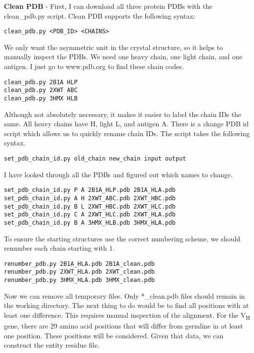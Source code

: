 \textbf{Clean PDB} - First, I can download all three protein PDBs with the clean\_pdb.py script. Clean PDB supports the following syntax:


\begin{lstlisting}[breaklines=true]
clean_pdb.py <PDB_ID> <CHAINS>
\end{lstlisting}

We only want the asymmetric unit in the crystal structure, so it helps to manually inspect the PDBs. We need one heavy chain, one light chain, and one antigen. I just go to www.pdb.org to find these chain codes.
\begin{lstlisting}
clean_pdb.py 2B1A HLP
clean_pdb.py 2XWT ABC
clean_pdb.py 3HMX HLB
\end{lstlisting}
Although not absolutely necessary, it makes it easier to label the chain IDs the same. All heavy chains have H, light L, and antigen A. There is a change PDB id script which allows us to quickly rename chain IDs. The script takes the following syntax.

\begin{lstlisting}[breaklines=true]
set_pdb_chain_id.py old_chain new_chain input output
\end{lstlisting}
I have looked through all the PDBs and figured out which names to change.

\begin{lstlisting}
set_pdb_chain_id.py P A 2B1A_HLP.pdb 2B1A_HLA.pdb
set_pdb_chain_id.py A H 2XWT_ABC.pdb 2XWT_HBC.pdb
set_pdb_chain_id.py B L 2XWT_HBC.pdb 2XWT_HLC.pdb
set_pdb_chain_id.py C A 2XWT_HLC.pdb 2XWT_HLA.pdb
set_pdb_chain_id.py B A 3HMX_HLB.pdb 3HMX_HLA.pdb
\end{lstlisting}
To ensure the starting structures use the correct numbering scheme, we should renumber each chain starting with 1.

\begin{lstlisting}[breaklines=true]
renumber_pdb.py 2B1A_HLA.pdb 2B1A_clean.pdb
renumber_pdb.py 2XWT_HLA.pdb 2XWT_clean.pdb
renumber_pdb.py 3HMX_HLA.pdb 3HMX_clean.pdb
\end{lstlisting}
Now we can remove all temporary files. Only *\_clean.pdb files should remain in the working directory. The next thing to do would be to find all positions with at least one difference. This requires manual inspection of the alignment. For the V\textsubscript{H} gene, there are 29 amino acid positions that will differ from germline in at least one position. These positions will be considered. Given that data, we can construct the entity residue file.

